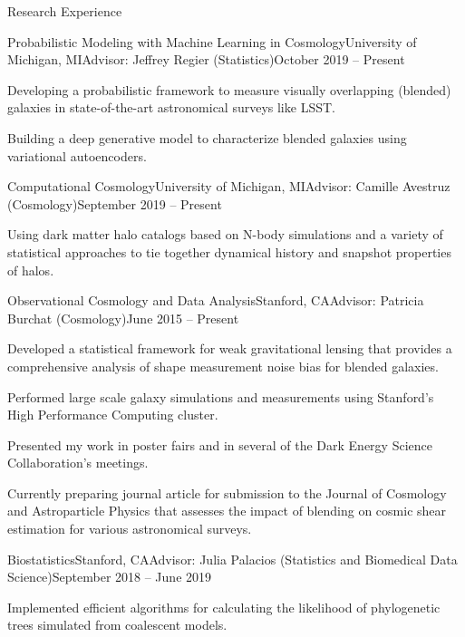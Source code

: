 \begin{rSection}{Research Experience}

\begin{rSubsection}{Probabilistic Modeling with Machine Learning in Cosmology}{University of Michigan, MI}{Advisor: Jeffrey Regier (Statistics)}{October 2019 -- Present}
\item Developing a probabilistic framework to measure visually overlapping (blended) galaxies in state-of-the-art astronomical surveys like LSST. 
\item Building a deep generative model to characterize blended galaxies using variational autoencoders. 
\end{rSubsection}

\begin{rSubsection}{Computational Cosmology}{University of Michigan, MI}{Advisor: Camille Avestruz (Cosmology)}{September 2019 -- Present}
\item Using dark matter halo catalogs based on N-body simulations and a variety of statistical approaches to tie together dynamical history and snapshot properties of halos. 
\end{rSubsection}

\begin{rSubsection}{Observational Cosmology and Data Analysis}{Stanford, CA}{Advisor: Patricia Burchat (Cosmology)}{June 2015 -- Present}
\item Developed a statistical framework for weak gravitational lensing that provides a comprehensive analysis of shape measurement noise bias for blended galaxies.
\item Performed large scale galaxy simulations and measurements using Stanford's High Performance Computing cluster.
\item Presented my work in poster fairs and in several of the Dark Energy Science Collaboration's meetings. 
\item Currently preparing journal article for submission to the Journal of Cosmology and Astroparticle Physics that assesses the impact of blending on cosmic shear estimation for various astronomical surveys. 
\end{rSubsection}

\begin{rSubsection}{Biostatistics}{Stanford, CA}{Advisor: Julia Palacios (Statistics and Biomedical Data Science)}{September 2018 -- June 2019}
\item Implemented efficient algorithms for calculating the likelihood of phylogenetic trees simulated from coalescent models.


\end{rSubsection}
\end{rSection}
